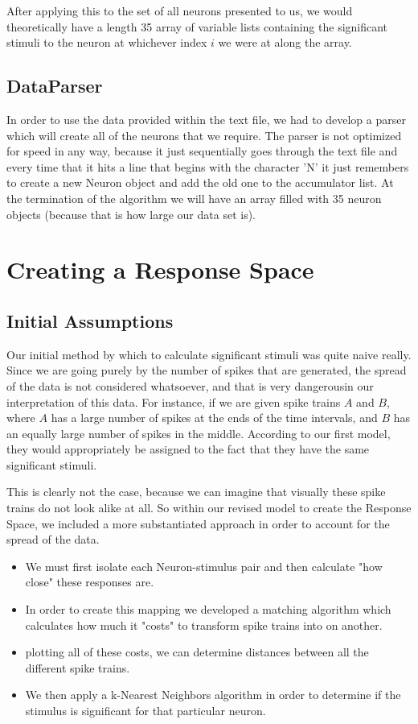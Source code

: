 \documentclass[12pt]{article} %
\begin{document}
After applying this to the set of all neurons presented to us, we would theoretically have a length 35 array of variable lists containing the significant stimuli to the neuron at whichever index $i$ we were at along the array. 

\subsection{DataParser}
In order to use the data provided within the text file, we had to develop a  parser which will create all of the neurons that we require. The parser is not optimized for speed in any way, because it just sequentially goes through the text file and every time that it hits a line that begins with the character 'N' it just remembers to create a new Neuron object and add the old one to the accumulator list. At the termination of the algorithm we will have an array filled with 35 neuron objects (because that is how large our data set is).

\section{Creating a Response Space}
\subsection{Initial Assumptions}
Our initial method by which to calculate significant stimuli was quite naive really. Since we are going purely by the number of spikes that are generated, the spread of the data is not considered whatsoever, and that is very dangerousin our interpretation of this data. For instance, if we are given spike trains $A$ and $B$, where $A$ has a large number of spikes at the ends of the time intervals, and $B$ has an equally large number of spikes in the middle. According to our first model, they would appropriately be assigned to the fact that they have the same significant stimuli. 

This is clearly not the case, because we can imagine that visually these spike trains do not look alike at all. 
So within our revised model to create the Response Space, we included a more substantiated approach in order to account for the spread of the data. 
\begin{itemize}
\item We must first isolate each Neuron-stimulus pair and then calculate "how close" these responses are.
\item In order to create this mapping we developed a matching algorithm which calculates how much it "costs" to transform spike trains into on another. 
\item plotting all of these costs, we can determine distances between all the different spike trains.
\item We then apply a k-Nearest Neighbors algorithm in order to determine if the stimulus is significant for that particular neuron. 
\end{itemize}
\end{document}

